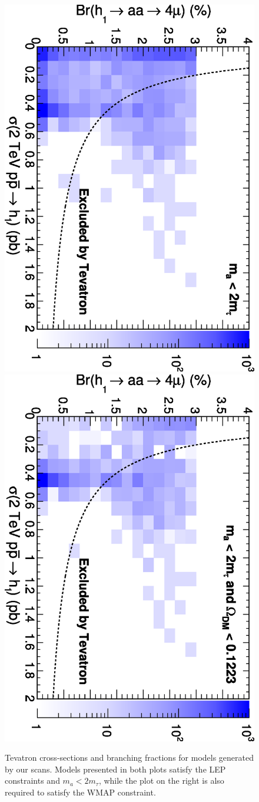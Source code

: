 \documentclass[aps,12pt,superscriptaddress,nofootinbib,floatfix,showpacs]{revtex4}
\begin{document}
\begin{figure}
\includegraphics[height=0.48\linewidth, angle=90]{plots/newbranching/exclusion_tevatron_noDMconstratint.eps}
\includegraphics[height=0.48\linewidth, angle=90]{plots/newbranching/exclusion_tevatron_withDMconstratint.eps}

\caption{Tevatron cross-sections and branching fractions for
  models generated by our scans.  Models presented in both plots
  satisfy the LEP constraints and $m_a < 2m_\tau$, while the plot on
  the right is also required to satisfy the WMAP constraint. \label{fig:exclusion}}
\end{figure}
\end{document}
